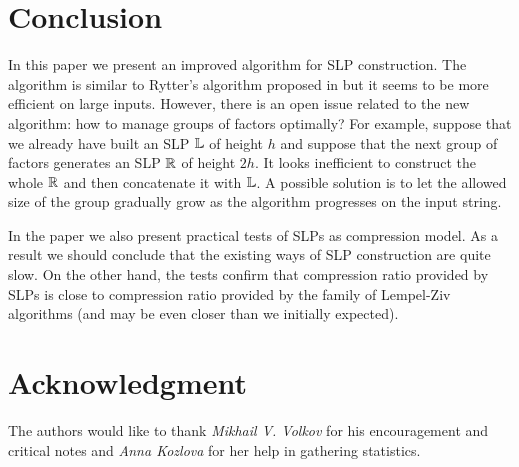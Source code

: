 \documentclass[10pt]{article}
\begin{document}
\begin{center}
	\RandomCompression
\end{center}

\section{Conclusion}

In this paper we present an improved algorithm for SLP construction. The algorithm is similar to Rytter's algorithm
proposed in \cite{SLPConstruction} but it seems to be more efficient on large inputs. However, there is an open
issue related to the new algorithm: how to manage groups of factors optimally? For example, suppose that we already have
built an SLP $\mathbb{L}$ of height $h$ and suppose that the next group of factors generates an SLP $\mathbb{R}$ of height
$2h$. It looks inefficient to construct the whole $\mathbb{R}$ and then concatenate it with $\mathbb{L}$. A possible solution
is to let the allowed size of the group gradually grow as the algorithm progresses on the input string.

In the paper we also present practical tests of SLPs as compression model. As a result we should conclude that the
existing ways of SLP construction are quite slow. On the other hand, the tests confirm that compression ratio provided by
SLPs is close to compression ratio provided by the family of Lempel-Ziv algorithms (and may be even closer than we
initially expected).

\section*{Acknowledgment}

The authors would like to thank \emph{Mikhail V. Volkov} for his encouragement and critical notes and \emph{Anna
Kozlova} for her help in gathering statistics.



\end{document}

